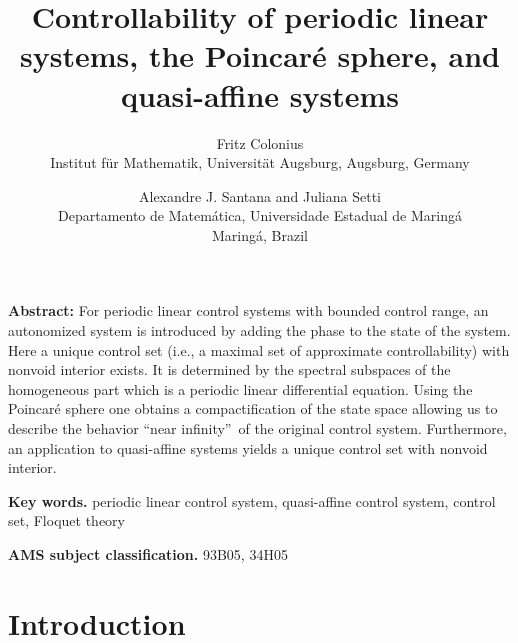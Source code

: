 \documentclass{siamltex}%
\begin{document}
\title{Controllability of periodic linear systems, the Poincar\'{e} sphere, and
quasi-affine systems}
\author{Fritz Colonius\\Institut f\"{u}r Mathematik, Universit\"{a}t Augsburg, Augsburg, Germany
\and Alexandre J. Santana and Juliana Setti\\Departamento de Matem\'{a}tica, Universidade Estadual de Maring\'{a}\\Maring\'{a}, Brazil}
\maketitle

\textbf{Abstract: }For periodic linear control systems with bounded control
range, an autonomized system is introduced by adding the phase to the state of
the system. Here a unique control set (i.e., a maximal set of approximate
controllability) with nonvoid interior exists. It is determined by the
spectral subspaces of the homogeneous part which is a periodic linear
differential equation. Using the Poincar\'{e} sphere one obtains a
compactification of the state space allowing us to describe the behavior
\textquotedblleft near infinity\textquotedblright\ of the original control
system. Furthermore, an application to quasi-affine systems yields a unique
control set with nonvoid interior.

\textbf{Key words. }periodic linear control system, quasi-affine control
system, control set, Floquet theory

\textbf{AMS subject classification.} 93B05, 34H05

\section{Introduction}
\end{document}
